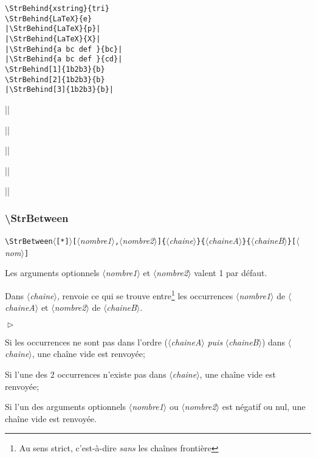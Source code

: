 \documentclass[a4paper,10pt]{article}
\newcommand\argu[1]{$\langle$\textit{#1}$\rangle$}
\newcommand\ARGU[1]{\texttt{\color{black}\{}\argu{#1}\texttt{\color{black}\}}}
\newcommand\arguC[1]{\texttt{\color{black}[}\argu{#1}\texttt{\color{black}]}}
\newcommand\arguCC[2]{\texttt{\color{black}[}\argu{#1}\texttt{\color{black},}\argu{#2}\texttt{\color{black}]}}
\newcommand\etoile{$\langle$\texttt{[*]}$\rangle$}
\newenvironment{Conditions}[1][1cm]%
{\begin{list}%
	{$\vartriangleright$}%
	{\setlength{\leftmargin}{#1}
	 \setlength{\itemsep}{0pt}
	 \setlength{\parsep}{0pt}
	 \setlength{\topsep}{2ptplus3ptminus2pt}
	}}%
{\end{list}}
\newcommand\styleexemple{\small\vskip4pt}
\newcommand\verbinline{\lstinline[basicstyle=\normalsize\ttfamily]}
\begin{document}
\begin{minipage}[t]{0.65\linewidth}
\begin{lstlisting}
\StrBehind{xstring}{tri}
\StrBehind{LaTeX}{e}
|\StrBehind{LaTeX}{p}|
|\StrBehind{LaTeX}{X}|
|\StrBehind{a bc def }{bc}|
|\StrBehind{a bc def }{cd}|
\StrBehind[1]{1b2b3}{b}
\StrBehind[2]{1b2b3}{b}
|\StrBehind[3]{1b2b3}{b}|
\end{lstlisting}%
\end{minipage}\hfill
\begin{minipage}[t]{0.35\linewidth}
	\styleexemple
	\par
	\par
	||\par
	||\par
	||\par
	||\par
	\par
	\par
	||
\end{minipage}%

\subsubsection{\ttfamily\textbackslash StrBetween}
\verbinline|\StrBetween|\etoile\arguCC{nombre1}{nombre2}\ARGU{chaine}\ARGU{chaineA}\ARGU{chaineB}\arguC{nom}
\smallskip

Les arguments optionnels \argu{nombre1} et \argu{nombre2} valent 1 par défaut.\par\nobreak\smallskip
Dans \argu{chaine}, renvoie ce qui se trouve entre\footnote{Au sens strict, c'est-à-dire \emph{sans} les chaînes frontière} les occurrences \no\argu{nombre1} de \argu{chaineA} et \no \argu{nombre2} de \argu{chaineB}.\medskip

\begin{Conditions}
	\item Si les occurrences ne sont pas dans l'ordre (\argu{chaineA} \emph{puis} \argu{chaineB}) dans \argu{chaine}, une chaîne vide est renvoyée;
	\item Si l'une des 2 occurrences n'existe pas dans \argu{chaine}, une chaîne vide est renvoyée;
	\item Si l'un des arguments optionnels \argu{nombre1} ou \argu{nombre2} est négatif ou nul, une chaîne vide est renvoyée.
\end{Conditions}
\end{document}
